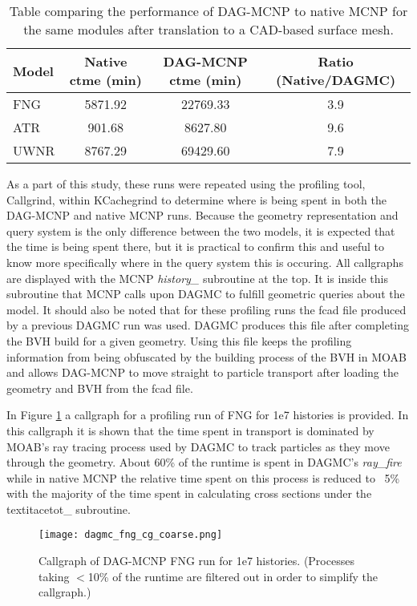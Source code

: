 \begin{table}[H]
  \centering
  \begin{tabular}{l c c c}
    \toprule
    Model & Native ctme (min) & DAG-MCNP ctme (min) & Ratio (Native/DAGMC) \\
    \hline
    FNG &  5871.92 & 22769.33 & 3.9\\
    ATR &  901.68 & 8627.80 & 9.6 \\
    UWNR &  8767.29 & 69429.60 & 7.9\\
    \hline
  \end{tabular}
  \caption{Table comparing the performance of DAG-MCNP to native MCNP for the same modules after translation to a CAD-based surface mesh.}
  \label{dag-mcnp-benchmarks}  
\end{table}

As a part of this study, these runs were repeated using the profiling tool,
Callgrind, within KCachegrind to determine where is being spent in both the
DAG-MCNP and native MCNP runs. Because the geometry representation and query
system is the only difference between the two models, it is expected that the
time is being spent there, but it is practical to confirm this and useful to
know more specifically where in the query system this is occuring. All
callgraphs are displayed with the MCNP \textit{history\_} subroutine at the
top. It is inside this subroutine that MCNP calls upon DAGMC to fulfill
geometric queries about the model. It should also be noted that for these
profiling runs the fcad file produced by a previous DAGMC run was used. DAGMC
produces this file after completing the BVH build for a given geometry. Using
this file keeps the profiling information from being obfuscated by the building
process of the BVH in MOAB and allows DAG-MCNP to move straight to particle
transport after loading the geometry and BVH from the fcad file.

In Figure \ref{dagmc-fng-coarse} a callgraph for a profiling run of FNG for 1e7
histories is provided. In this callgraph it is shown that the time spent in
transport is dominated by MOAB's ray tracing process used by DAGMC to track
particles as they move through the geometry. About 60\% of the runtime is spent
in DAGMC's \textit{ray\_fire} while in native MCNP the relative time spent on
this process is reduced to ~5\% with the majority of the time spent in
calculating cross sections under the textit{acetot\_} subroutine.

\begin{figure}[H]
  \centering
  \caption{Callgraph of DAG-MCNP FNG run for 1e7 histories. (Processes taking
    $<$10\% of the runtime are filtered out in order to simplify the callgraph.)}
  \label{dagmc-fng-coarse}
  \texttt{[image: dagmc\_fng\_cg\_coarse.png]}
\end{figure}

